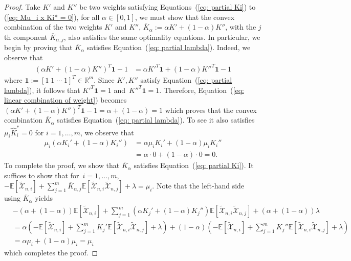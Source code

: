 \documentclass[10pt]{article} %
\begin{document}
	\begin{proof} 
		Take $K'$ and $K''$ be two weights satisfying Equations~(\ref{eq: partial Ki}) to (\ref{eq: Mu_i x Ki* = 0}),  for all $\alpha \in [0,1]$, we must show that the convex combination of the two weights $K'$ and $K''$,
		$
		\overline{K}_\alpha := \alpha K' + (1-\alpha)K''
		$,  with the $j$th component $\overline{K}_{\alpha,j}$,
		also satisfies the same optimality equations. 
		In particular, we begin by proving that $\overline{K}_\alpha$ satisfies Equation~(\ref{eq: partial lambda}). 
		Indeed, we observe that
		\begin{align}
			(\alpha K' + (1-\alpha)K'')^T \textbf{1} -1 &=	\alpha K'^T\textbf{1}  + (1-\alpha)K''^T \textbf{1} -1 \label{eq: linear combination of weight}
		\end{align}
		where $\textbf{1} := [1 \; 1 \; \cdots \; 1]^T \in \mathbb{R}^m.$
		Since $K',K''$ satisfy Equation~(\ref{eq: partial lambda}), it follows that $ K'^T \textbf{1} = 1$ and~$K''^T \textbf{1} = 1.$ 
		Therefore, Equation~(\ref{eq: linear combination of weight}) becomes
		$	(\alpha K' + (1-\alpha)K'')^T \textbf{1} -1  = \alpha + (1-\alpha) = 1
		$	
		which proves that the convex combination $\overline{K}_\alpha$ satisfies Equation~(\ref{eq: partial lambda}).
		To see it also satisfies $\mu_i \widehat{K}_i^* = 0$ for $i=1,\dots, m$, we observe that
		\begin{align*}
			\mu_i (\alpha K_i' + (1-\alpha)K_i'') 
			&= \alpha \mu_i K_i' + (1-\alpha) \mu_i K_i'' \\
			&= \alpha \cdot 0 + (1-\alpha) \cdot 0 = 0. 
		\end{align*}
		To complete the proof, we show that $\overline{K}_\alpha$ satisfies Equation~(\ref{eq: partial Ki}). It suffices to show that for~$i=1,\dots,m$,
		$
		-\mathbb{E}\left[\widetilde{\mathcal{X}}_{n,i} \right] + \sum_{j=1}^m \overline{K}_{\alpha,j} \mathbb{E}\left[ \widetilde{\mathcal{X}}_{n,i} \widetilde{\mathcal{X}}_{n,j} \right] + \lambda = \mu_i. 
		$
		Note that the left-hand side using $\overline{K}_\alpha$ yields
		\begin{align*} 
			&-(\alpha + (1-\alpha))\mathbb{E}\left[ \widetilde{\mathcal{X}}_{n,i} \right] 
			+ \sum_{j=1}^m (\alpha K_j' + (1-\alpha) K_j'') \mathbb{E}\left[ \widetilde{\mathcal{X}}_{n,i} \widetilde{\mathcal{X}}_{n,j} \right] + (\alpha + (1-\alpha)) \lambda  \\
			&= \alpha \left( - \mathbb{E}\left[ \widetilde{\mathcal{X}}_{n,i} \right]  + \sum_{j=1}^m  K_j'  \mathbb{E}\left[ \widetilde{\mathcal{X}}_{n,i} \widetilde{\mathcal{X}}_{n,j} \right] + \lambda \right)  + (1-\alpha )\left(-\mathbb{E}\left[ \widetilde{\mathcal{X}}_{n,i} \right]  + \sum_{j=1}^m  K_j'' \mathbb{E}\left[ \widetilde{\mathcal{X}}_{n,i} \widetilde{\mathcal{X}}_{n,j} \right] +  \lambda \right) \\
			&= \alpha \mu_i + (1-\alpha) \mu_i = \mu_i
		\end{align*}
		which completes the proof.
	\end{proof}
	
\end{document}

